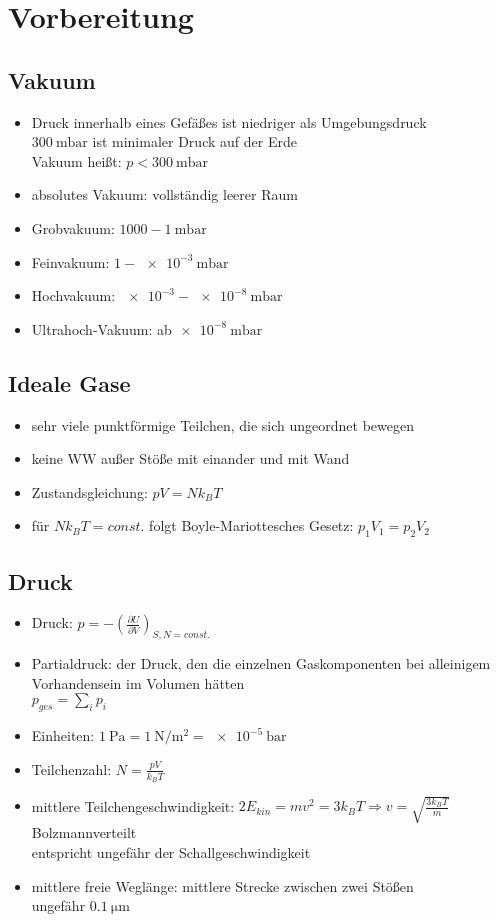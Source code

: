 \section{Vorbereitung}
\subsection{Vakuum}
\begin{itemize}
    \item Druck innerhalb eines Gefäßes ist niedriger als Umgebungsdruck\\
    \to $\SI{300}{\milli\bar}$ ist minimaler Druck auf der Erde\\
    \to Vakuum heißt: $p<\SI{300}{\milli\bar}$
    \item absolutes Vakuum: vollständig leerer Raum
    \item Grobvakuum: $\num{1000}-\SI{1}{\milli\bar}$
    \item Feinvakuum: $\num{1}-\SI{e-3}{\milli\bar}$
    \item Hochvakuum: $\num{e-3}-\SI{e-8}{\milli\bar}$
    \item Ultrahoch-Vakuum: ab$\SI{e-8}{\milli\bar}$
\end{itemize}
\subsection{Ideale Gase}
\begin{itemize}
    \item sehr viele punktförmige Teilchen, die sich ungeordnet bewegen
    \item keine WW außer Stöße mit einander und mit Wand
    \item Zustandsgleichung: $pV=Nk_BT$
    \item für $Nk_BT=const.$ folgt Boyle-Mariottesches Gesetz: $p_1V_1=p_2V_2$
\end{itemize}

\subsection{Druck}
\begin{itemize}
    \item Druck: $p=-\left(\frac{\partial U}{\partial V}\right)_{S,N=const.}$
    \item Partialdruck: der Druck, den die einzelnen Gaskomponenten bei alleinigem Vorhandensein im Volumen hätten\\
    \to $p_{ges}=\sum_i p_i$ 
    \item Einheiten: $\SI{1}{\pascal}=\SI{1}{\newton\per\square\metre}=\SI{e-5}{\bar}$
    \item Teilchenzahl: $N=\frac{pV}{k_BT}$
    \item mittlere Teilchengeschwindigkeit: $2E_{kin}=mv^2=3k_BT\Rightarrow v=\sqrt{\frac{3k_BT}{m}}$\\
    \to Bolzmannverteilt\\
    \to entspricht ungefähr der Schallgeschwindigkeit
    \item mittlere freie Weglänge: mittlere Strecke zwischen zwei Stößen\\
    \to ungefähr $\SI{0.1}{\micro\metre}$
\end{itemize}
